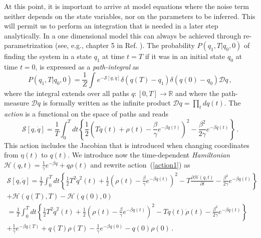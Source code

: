 \documentclass[11pt]{article}
\theoremstyle{definition}
\begin{document}
At this point, it is important to arrive at model equations where the noise term neither depends on the state variables, nor on the parameters to be inferred.
This will permit us to perform an integration that is needed in a later step analytically.
In a one dimensional model this can always be achieved through re-parametrization (see, e.g., chapter 5 in Ref. \cite{risken_1989_FockerPlanck}). The probability $P(q_1,T|q_0,0)$ of finding the system in a state $q_1$ at time $t = T$ if it was in an initial state $q_0$ at time $t = 0$, is expressed as a {\em path-integral} as
\begin{equation}\label{pathint}
P(q_1,T|q_0,0)
=
\frac{1}{Z}
\int
e^{-{\mathcal S}[q,\dot q]}
\delta(q(T)-q_1)
\delta(q(0)-q_0)
\mathcal{D}q \,,
\end{equation}
where the integral extends over all paths $q:[0,T]\rightarrow \mathbb R$ and where the path-measure $\mathcal Dq$ is formally written as the infinite product
${\mathcal Dq}=\prod_{t}dq(t)$.
The {\em action} is a functional on the space of paths and reads  \cite{lau_2007}
\begin{equation}\label{action1}
{\mathcal S}[{q},\dot q]
=
\frac{1}{T}
\int_0^T dt \left\{
\frac{1}{2}
\left(
    T\dot q(t)
    +
    \rho(t)
    -
    \frac{\beta}{\gamma}e^{-\beta q(t)}\right)^2
    -
    \frac{\beta^2}{2\gamma}e^{-\beta q(t)}
\right\} \,.
\end{equation}
This action includes the Jacobian that is introduced when changing coordinates from
 ${\eta(t)}$ to $q(t)$.
We introduce now the time-dependent {\em Hamiltonian}
$  \mathcal{H}(q,t)= \frac{1}{\gamma}e^{-\beta q}+q\rho(t)$
and rewrite action~(\ref{action1}) as
\begin{multline}\label{action}
{\mathcal S}[{q},\dot q]
= \frac{1}{T}
\int_0^T dt\left\{
    \frac{1}{2}
    T^2\dot q^2(t) +
    \frac{1}{2}
    \left(\rho(t)-\frac{\beta}{\gamma}e^{-\beta q(t)}\right)^2 -
    T\frac{\partial \mathcal{H}(q,t)}{\partial t} -
    \frac{\beta^2}{2\gamma}e^{-\beta q(t)}
\right\}
\\
+ \mathcal{H}(q(T),T) - \mathcal{H}(q(0),0)
\\
= \frac{1}{T}
\int_0^T dt\left\{
    \frac{1}{2}
    T^2\dot q^2(t) +
    \frac{1}{2}
    \left(\rho(t)-\frac{\beta}{\gamma}e^{-\beta q(t)}\right)^2 -
    Tq(t)\dot\rho(t) -
     \frac{\beta^2}{2\gamma}e^{-\beta q(t)}
\right\}
\\
+
    \frac{1}{\gamma}e^{-\beta q(T)}+q(T)\rho(T)
   -\frac{1}{\gamma}e^{-\beta q(0)}-q(0)\rho(0)
\,.
\end{multline}
\end{document}
